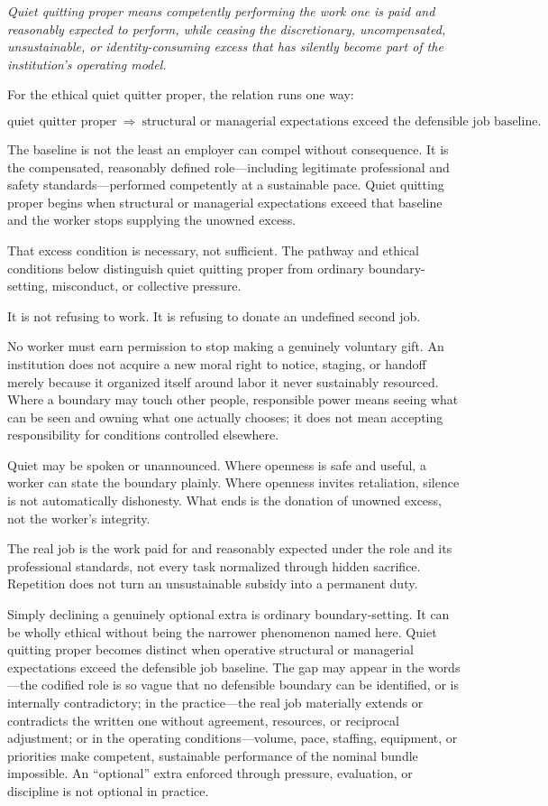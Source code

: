 \documentclass[11pt,oneside]{article}
\renewenvironment{quote}
  {\begin{tcolorbox}[
      enhanced,
      breakable,
      colback=ManifestLight,
      colframe=ManifestRule,
      boxrule=0pt,
      leftrule=3pt,
      arc=0pt,
      outer arc=0pt,
      left=10pt,right=10pt,top=8pt,bottom=8pt,
      before skip=0.8em,after skip=0.8em
    ]\itshape}
  {\end{tcolorbox}}
\begin{document}
\begin{quote}
Quiet quitting proper means competently performing the work one is paid
and reasonably expected to perform, while ceasing the discretionary,
uncompensated, unsustainable, or identity-consuming excess that has
silently become part of the institution's operating model.
\end{quote}

For the ethical quiet quitter proper, the relation runs one way:

\[
\boxed{\text{quiet quitter proper}\ \Longrightarrow\ \text{structural or managerial expectations exceed the defensible job baseline}.}
\]

The baseline is not the least an employer can compel without
consequence. It is the compensated, reasonably defined role---including
legitimate professional and safety standards---performed competently at
a sustainable pace. Quiet quitting proper begins when structural or
managerial expectations exceed that baseline and the worker stops
supplying the unowned excess.

That excess condition is necessary, not sufficient. The pathway and
ethical conditions below distinguish quiet quitting proper from ordinary
boundary-setting, misconduct, or collective pressure.

It is not refusing to work. It is refusing to donate an undefined second
job.

No worker must earn permission to stop making a genuinely voluntary
gift. An institution does not acquire a new moral right to notice,
staging, or handoff merely because it organized itself around labor it
never sustainably resourced. Where a boundary may touch other people,
responsible power means seeing what can be seen and owning what one
actually chooses; it does not mean accepting responsibility for
conditions controlled elsewhere.

Quiet may be spoken or unannounced. Where openness is safe and useful, a
worker can state the boundary plainly. Where openness invites
retaliation, silence is not automatically dishonesty. What ends is the
donation of unowned excess, not the worker's integrity.

The real job is the work paid for and reasonably expected under the role
and its professional standards, not every task normalized through hidden
sacrifice. Repetition does not turn an unsustainable subsidy into a
permanent duty.

Simply declining a genuinely optional extra is ordinary
boundary-setting. It can be wholly ethical without being the narrower
phenomenon named here. Quiet quitting proper becomes distinct when
operative structural or managerial expectations exceed the defensible
job baseline. The gap may appear in the words---the codified role is so
vague that no defensible boundary can be identified, or is internally
contradictory; in the practice---the real job materially extends or
contradicts the written one without agreement, resources, or reciprocal
adjustment; or in the operating conditions---volume, pace, staffing,
equipment, or priorities make competent, sustainable performance of the
nominal bundle impossible. An ``optional'' extra enforced through
pressure, evaluation, or discipline is not optional in practice.
\end{document}
